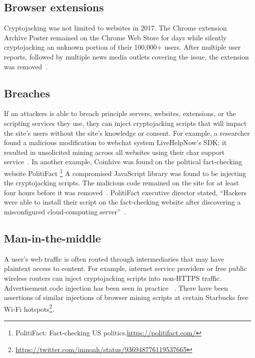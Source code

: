 \subsection{Browser extensions} 

Cryptojacking was not limited to websites in 2017. The Chrome extension Archive Poster remained on the Chrome Web Store for days while silently cryptojacking an unknown portion of their 100,000+ users. After multiple user reports, followed by multiple news media outlets covering the issue, the extension was removed~\cite{chromeextentioncoinhive}. 

\subsection{Breaches} 


If an attackers is able to breach principle servers, websites, extensions, or the scripting services they use, they can inject cryptojacking scripts that will impact the site's users without the site's knowledge or consent. For example, a researcher found a malicious modification to webchat system LiveHelpNow's SDK; it resulted in unsolicited mining across all websites using their char support service~\cite{chatsupporthack}. In another example, Coinhive was found on the political fact-checking website PolitiFact \footnote{PolitiFact: Fact-checking US politics.\url{https://politifact.com/}} A compromised JavaScript library was found to be injecting the cryptojacking scripts. The malicious code remained on the site for at least four hours before it was removed~\cite{politifactcoinhive}. PolitiFact executive director stated, ``Hackers were able to install their script on the fact-checking website after discovering a misconfigured cloud-computing server''~\cite{politifactcoinhivewsj}.


\subsection{Man-in-the-middle} 

A user's web traffic is often routed through intermediaries that may have plaintext access to content. For example, internet service providers or free public wireless routers can inject cryptojacking scripts into non-HTTPS traffic. Advertisement code injection has been seen in practice ~\cite{vergeadinjection}. There have been assertions of similar injections of browser mining scripts at certain Starbucks free Wi-Fi hotspots\footnote{\url{https://twitter.com/imnoah/status/936948776119537665}}.






